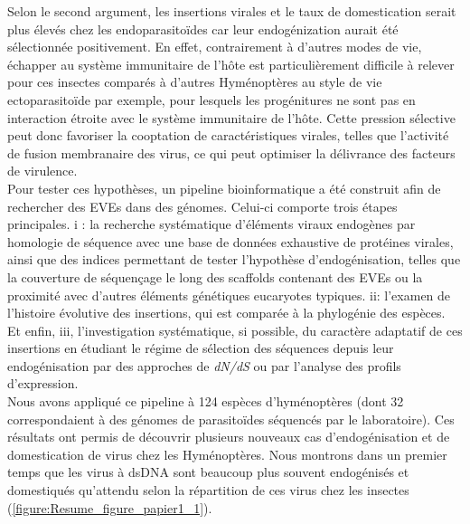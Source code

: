 Selon le second argument, les insertions virales et le taux de domestication serait plus élevés chez les endoparasitoïdes car leur endogénization aurait été sélectionnée positivement. En effet, contrairement à d'autres modes de vie, échapper au système immunitaire de l'hôte est particulièrement difficile à relever pour ces insectes comparés à d'autres Hyménoptères au style de vie ectoparasitoïde par exemple, pour lesquels les progénitures ne sont pas en interaction étroite avec le système immunitaire de l'hôte. Cette pression sélective peut donc favoriser la cooptation de caractéristiques virales, telles que l'activité de fusion membranaire des virus, ce qui peut optimiser la délivrance des facteurs de virulence.\\

Pour tester ces hypothèses, un pipeline bioinformatique a été construit afin de rechercher des EVEs dans des génomes. Celui-ci comporte trois étapes principales. i : la recherche systématique d'éléments viraux endogènes par homologie de séquence avec une base de données exhaustive de protéines virales, ainsi que des indices permettant de tester l'hypothèse d'endogénisation, telles que la couverture de séquençage le long des scaffolds contenant des EVEs ou la proximité avec d'autres éléments génétiques eucaryotes typiques. ii: l'examen de l'histoire évolutive des insertions, qui est comparée à la phylogénie des espèces. Et enfin, iii, l'investigation systématique, si possible, du caractère adaptatif de ces insertions en étudiant le régime de sélection des séquences depuis leur endogénisation par des approches de \textit{dN/dS} ou par l'analyse des profils d'expression. \\

Nous avons appliqué ce pipeline à 124 espèces d'hyménoptères (dont 32 correspondaient à des génomes de parasitoïdes séquencés par le laboratoire). Ces résultats ont permis de découvrir plusieurs nouveaux cas d'endogénisation et de domestication de virus chez les Hyménoptères. Nous montrons dans un premier temps que les virus à dsDNA sont beaucoup plus souvent endogénisés et domestiqués qu'attendu selon la répartition de ces virus chez les insectes (\figurename{\ref{figure:Resume_figure_papier1_1}}).\\

